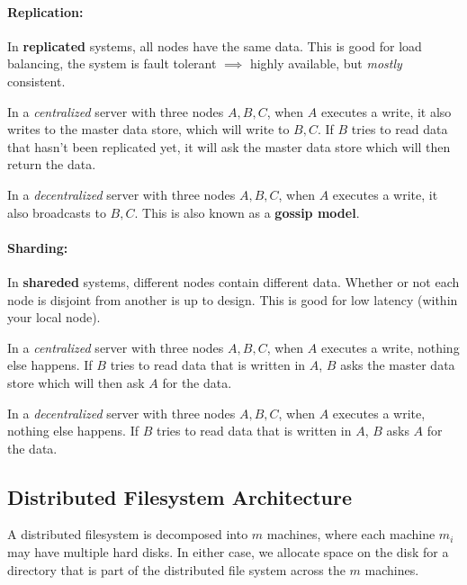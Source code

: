 \documentclass{report}
\newenvironment{example}{\begin{tcolorbox}[title={Example},colback=green!5!white,colframe=black!75!green]}{\end{tcolorbox}}
\renewcommand{\bf}[1]{\textbf{{#1}}}
\renewcommand{\it}[1]{\textit{{#1}}}
\begin{document}
\paragraph{Replication:} In \bf{replicated} systems, all nodes have the same
data. This is good for load balancing, the system is fault tolerant $\implies$
highly available, but \it{mostly} consistent.
\begin{example}
    In a \it{centralized} server with three nodes $A, B, C$, when $A$ executes
    a write, it also writes to the master data store, which will write to
    $B, C$. If $B$ tries to read data that hasn't been replicated yet, it will
    ask the master data store which will then return the data.
    \vspace{0.5em}

    In a \it{decentralized} server with three nodes $A, B, C$, when $A$
    executes a write, it also broadcasts to $B, C$. This is also known as a
    \bf{gossip model}.
\end{example}

\paragraph{Sharding:} In \bf{shareded} systems, different nodes contain
different data. Whether or not each node is disjoint from another is up to
design. This is good for low latency (within your local node).
\begin{example}
    In a \it{centralized} server with three nodes $A, B, C$, when $A$ executes
    a write, nothing else happens. If $B$ tries to read data that is written in
    $A$, $B$ asks the master data store which will then ask $A$ for the data.
    \vspace{0.5em}

    In a \it{decentralized} server with three nodes $A, B, C$, when $A$
    executes a write, nothing else happens. If $B$ tries to read data that is
    written in $A$, $B$ asks $A$ for the data.
\end{example}

\subsection{Distributed Filesystem Architecture}
A distributed filesystem is decomposed into $m$ machines, where each machine
$m_i$ may have multiple hard disks. In either case, we allocate space on the
disk for a directory that is part of the distributed file system across the $m$
machines.
\end{document}

